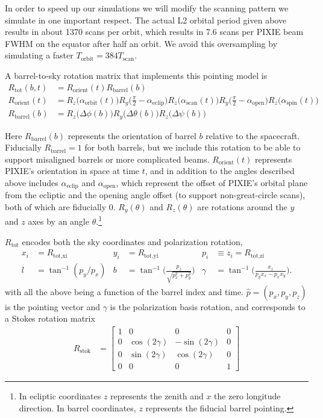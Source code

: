 \documentclass{article}
\begin{document}
In order to speed up our simulations we will modify the scanning pattern we
simulate in one important respect. The actual L2 orbital
period given above results in about 1370 scans per orbit, which results in
7.6 scans per PIXIE beam FWHM on the equator after half an orbit. We avoid
this oversampling by simulating a faster $T_\textrm{orbit} = 384 T_\textrm{scan}$.

A barrel-to-sky rotation matrix that implements this pointing model is
\begin{align}
	R_\textrm{tot}(b,t)  &= R_\textrm{orient}(t)R_\textrm{barrel}(b) \\
	R_\textrm{orient}(t) &= R_z\big(\alpha_\textrm{orbit}(t)\big)
		R_y\Big(\frac\pi2-\alpha_\textrm{eclip}\Big)
		R_z\big(\alpha_\textrm{scan}(t)\big)R_y\Big(\frac\pi2-\alpha_\textrm{open}\Big)
		R_z\big(\alpha_\textrm{spin}(t)\big) \\
	R_\textrm{barrel}(b) &= R_z\big(\Delta\phi(b)\big)R_y\big(\Delta\theta(b)\big)R_z\big(\Delta\psi(b)\big) \label{eq:barrel}
\end{align}

Here $R_\textrm{barrel}(b)$ represents the orientation of barrel $b$ relative
to the spacecraft. Fiducially $R_\textrm{barrel} = 1$ for both barrels, but
we include this rotation to be able to support misaligned barrels or more
complicated beams. $R_\textrm{orient}(t)$ represents PIXIE's orientation
in space at time $t$, and in addition to the angles described above includes
$\alpha_\textrm{eclip}$ and $\alpha_\textrm{open}$, which represent the
offset of PIXIE's orbital plane from the ecliptic and the opening angle
offset (to support non-great-circle scans), both of which are fiducially 0.
$R_y(\theta)$ and $R_z(\theta)$ are rotations around the $y$ and $z$ axes
by an angle $\theta$.\footnote{In ecliptic coordinates $z$ represents the
zenith and $x$ the zero longitude direction. In barrel coordinates, $z$
represents the fiducial barrel pointing.}

$R_\textrm{tot}$ encodes both the sky coordinates and polarization rotation,
\begin{align}
	x_i &= R_\textrm{tot,xi} & y_i &= R_\textrm{tot,yi} & p_i &\equiv z_i = R_\textrm{tot,zi} \\
	l        &= \tan^{-1}(p_y/p_x)  &
	b        &= \tan^{-1}\Big(\frac{p_z}{\sqrt{p_x^2+p_y^2}}\Big) &
	\gamma   &= \tan^{-1}\Big(\frac{x_z}{p_y x_x - p_x x_y}\Big).
\end{align}
with all the above being a function of the barrel index and time.
$\hat p = (p_x,p_y,p_z)$ is the pointing vector and $\gamma$ is the
polarization basis rotation, and corresponds to a Stokes rotation
matrix
\begin{align}
	R_\textrm{stok} &= \begin{bmatrix}
		1 & 0 & 0 & 0\\
		0 & \cos(2\gamma) & -\sin(2\gamma) & 0\\
		0 & \sin(2\gamma) & \cos(2\gamma) & 0 \\
		0 & 0 & 0 & 1
	\end{bmatrix}
\end{align}
\end{document}
